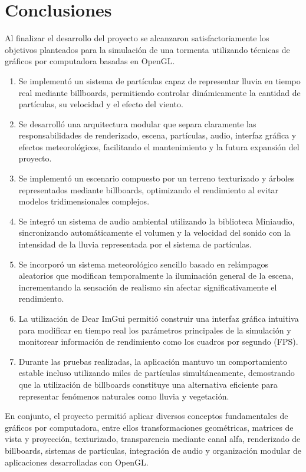 \chapter{Conclusiones}

Al finalizar el desarrollo del proyecto se alcanzaron satisfactoriamente los objetivos planteados para la simulación de una tormenta utilizando técnicas de gráficos por computadora basadas en OpenGL.

\begin{enumerate}

\item Se implementó un sistema de partículas capaz de representar lluvia en tiempo real mediante billboards, permitiendo controlar dinámicamente la cantidad de partículas, su velocidad y el efecto del viento.

\item Se desarrolló una arquitectura modular que separa claramente las responsabilidades de renderizado, escena, partículas, audio, interfaz gráfica y efectos meteorológicos, facilitando el mantenimiento y la futura expansión del proyecto.

\item Se implementó un escenario compuesto por un terreno texturizado y árboles representados mediante billboards, optimizando el rendimiento al evitar modelos tridimensionales complejos.

\item Se integró un sistema de audio ambiental utilizando la biblioteca Miniaudio, sincronizando automáticamente el volumen y la velocidad del sonido con la intensidad de la lluvia representada por el sistema de partículas.

\item Se incorporó un sistema meteorológico sencillo basado en relámpagos aleatorios que modifican temporalmente la iluminación general de la escena, incrementando la sensación de realismo sin afectar significativamente el rendimiento.

\item La utilización de Dear ImGui permitió construir una interfaz gráfica intuitiva para modificar en tiempo real los parámetros principales de la simulación y monitorear información de rendimiento como los cuadros por segundo (FPS).

\item Durante las pruebas realizadas, la aplicación mantuvo un comportamiento estable incluso utilizando miles de partículas simultáneamente, demostrando que la utilización de billboards constituye una alternativa eficiente para representar fenómenos naturales como lluvia y vegetación.

\end{enumerate}

En conjunto, el proyecto permitió aplicar diversos conceptos fundamentales de gráficos por computadora, entre ellos transformaciones geométricas, matrices de vista y proyección, texturizado, transparencia mediante canal alfa, renderizado de billboards, sistemas de partículas, integración de audio y organización modular de aplicaciones desarrolladas con OpenGL.